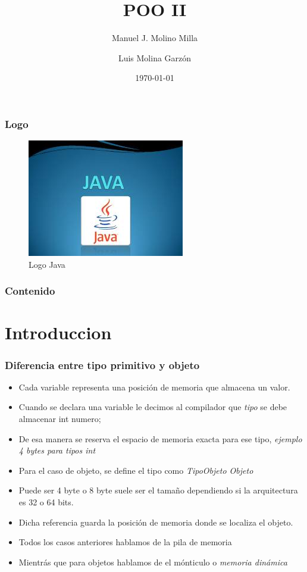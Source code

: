 \documentclass{beamer}
\title{POO II}
\author{Manuel J. Molino Milla \and Luis Molina Garzón}
\date{\today} %
\institute{IES Virgen del Carmen \and Departamento de Informática}
\begin{document}
\begin{frame}
  \titlepage
\end{frame}

\begin{frame}
    \frametitle{Logo}
\begin{figure}
\includegraphics[scale=1]{imagenes/logo.jpeg} 
\caption{Logo Java}
\end{figure}
\end{frame}

\begin{frame}
  \frametitle{Contenido}
  \tableofcontents[pausesections]
\end{frame}



\section{Introduccion}

\begin{frame}
\frametitle{Diferencia entre tipo primitivo y objeto}
\begin{itemize}[<+->]
\item Cada variable representa una posición de memoria que almacena un valor.
\item Cuando se declara una variable le decimos al compilador que \emph{tipo} se debe almacenar \alert{int numero;}
\item De esa manera se reserva el espacio de memoria exacta para ese tipo, \emph{ejemplo 4 bytes para tipos int}
\item Para el caso de objeto, se define el tipo como \emph{TipoObjeto Objeto}
\item Puede ser 4 byte o 8 byte suele ser el tamaño dependiendo si la arquitectura es 32 o 64 bits.
\item Dicha referencia guarda la posición de memoria donde se localiza el objeto.
\item Todos los casos anteriores hablamos de \alert{la pila de memoria}
\item Mientrás que para objetos hablamos de \alert{el mónticulo} o \emph{memoria dinámica}
\end{itemize}
\end{frame}
\end{document}
